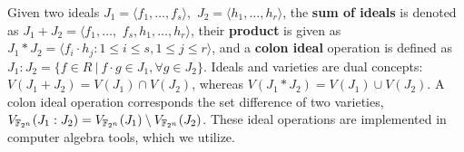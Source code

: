 Given two ideals $J_1 = \langle
f_1,\dots,f_s\rangle,$ $J_2=\langle h_1,\dots,h_r\rangle$, the {\bf
  sum of ideals} is denoted as $J_1 + J_2 = \langle
f_1,\dots,$ $f_s,h_1,\dots,h_r\rangle$, their {\bf product} is
given as $J_1 * J_2 = \langle f_i\cdot h_j: 1\leq i\leq s, 1\leq
j\leq r\rangle$, and a {\bf colon ideal} operation is defined as
$J_1:J_2 = \{f \in R\ |\ f\cdot g \in J_1, \forall g \in J_2\}$. 
Ideals and varieties are dual concepts:
$V(J_1 + J_2) = V(J_1) \cap V(J_2)$, whereas $V(J_1 * J_2) = V(J_1)
\cup V(J_2)$. A colon ideal operation corresponds the set difference of 
two varieties, $V_{{\mathbb{F}}_{2^n}}(J_1:J_2)=V_{{\mathbb{F}}_{2^n}}(J_1)
\setminus V_{{\mathbb{F}}_{2^n}}(J_2)$. 
These ideal operations are implemented in computer algebra tools, which we utilize.


